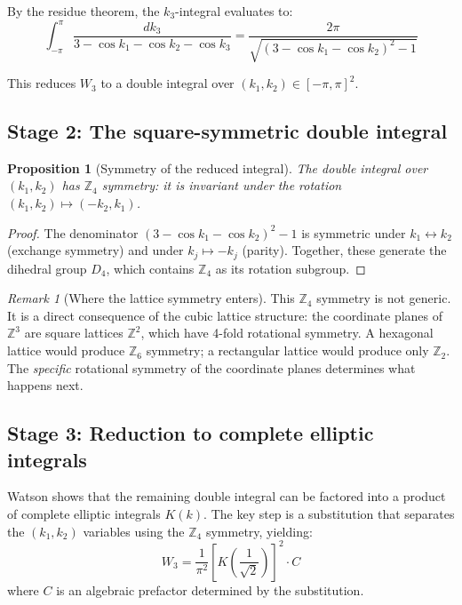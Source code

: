 \documentclass[12pt]{article}
\newtheorem{proposition}[theorem]{Proposition}
\theoremstyle{definition}
\theoremstyle{remark}
\newtheorem{remark}[theorem]{Remark}
\begin{document}
By the residue theorem, the $k_3$-integral evaluates to:
\begin{equation}
    \int_{-\pi}^{\pi} \frac{dk_3}{3 - \cos k_1 - \cos k_2 - \cos k_3} = \frac{2\pi}{\sqrt{(3 - \cos k_1 - \cos k_2)^2 - 1}}
\end{equation}

This reduces $W_3$ to a double integral over $(k_1, k_2) \in [-\pi, \pi]^2$.

\subsection{Stage 2: The square-symmetric double integral}

\begin{proposition}[Symmetry of the reduced integral]
\label{prop:z4}
The double integral over $(k_1, k_2)$ has $\mathbb{Z}_4$ symmetry: it is invariant under the rotation $(k_1, k_2) \mapsto (-k_2, k_1)$.
\end{proposition}

\begin{proof}
The denominator $(3 - \cos k_1 - \cos k_2)^2 - 1$ is symmetric under $k_1 \leftrightarrow k_2$ (exchange symmetry) and under $k_j \mapsto -k_j$ (parity). Together, these generate the dihedral group $D_4$, which contains $\mathbb{Z}_4$ as its rotation subgroup.
\end{proof}

\begin{remark}[Where the lattice symmetry enters]
\label{rmk:z4}
This $\mathbb{Z}_4$ symmetry is not generic. It is a direct consequence of the cubic lattice structure: the coordinate planes of $\mathbb{Z}^3$ are square lattices $\mathbb{Z}^2$, which have 4-fold rotational symmetry. A hexagonal lattice would produce $\mathbb{Z}_6$ symmetry; a rectangular lattice would produce only $\mathbb{Z}_2$. The \emph{specific} rotational symmetry of the coordinate planes determines what happens next.
\end{remark}

\subsection{Stage 3: Reduction to complete elliptic integrals}

Watson \cite{watson1939} shows that the remaining double integral can be factored into a product of complete elliptic integrals $K(k)$. The key step is a substitution that separates the $(k_1, k_2)$ variables using the $\mathbb{Z}_4$ symmetry, yielding:
\begin{equation}
    W_3 = \frac{1}{\pi^2}\left[K\!\left(\frac{1}{\sqrt{2}}\right)\right]^2 \cdot C
    \label{eq:watson-K}
\end{equation}
where $C$ is an algebraic prefactor determined by the substitution.
\end{document}
